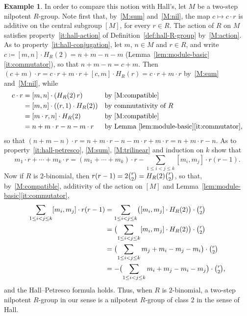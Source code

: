 \documentclass[reqno,a4paper]{amsart}
\renewcommand{\binom}{\tbinom} %
\theoremstyle{plain}
\theoremstyle{definition}
\newtheorem{example}[subsection]{Example}
\newcommand{\DefEq}{\coloneq}
\newcommand{\brk}[2]{\ensuremath{[#1,#2]}}
\begin{document}
\begin{example}
  In order to compare this notion with Hall's, let \(M\) be a two-step nilpotent \(R\)-group. Note first that, by~\ref{M:sum} and~\ref{M:nil}, the map \(c\mapsto c\cdot r\) is additive on the central subgroup \([M]\), for every \(r\in R\). The action of \(R\) on \(M\) satisfies property~\ref{it:hall-action} of Definition~\ref{def:hall-R-group} by~\ref{M:action}. As to property~\ref{it:hall-conjugation}, let \(m\), \(n\in M\) and \(r\in R\), and write \(c\DefEq\brk{m}{n}\cdot H_{R}(2)=n+m-n-m\) (Lemma~\ref{lem:module-basic}\ref{it:commutator}), so that \(n+m-n=c+m\). Then \((c+m)\cdot r=c\cdot r+m\cdot r+\brk{c}{m}\cdot H_{R}(r)=c\cdot r+m\cdot r\) by~\ref{M:sum} and~\ref{M:nil}, while
  \begin{align*}
    c\cdot r & =\brk{m}{n}\cdot(H_{R}(2)\,r)         &  & \text{by~\ref{M:compatible}}                               \\
             & =\brk{m}{n}\cdot((r,1)\cdot H_{R}(2)) &  & \text{by commutativity of \(R\)}                           \\
             & =\brk{m\cdot r}{n}\cdot H_{R}(2)      &  & \text{by~\ref{M:compatible}}                               \\
             & =n+m\cdot r-n-m\cdot r                &  & \text{by Lemma~\ref{lem:module-basic}\ref{it:commutator},}
  \end{align*}
  so that \((n+m-n)\cdot r=n+m\cdot r-n-m\cdot r+m\cdot r=n+m\cdot r-n\). As to property~\ref{it:hall-petresco}, \ref{M:sum}, \ref{M:trilinear} and induction on \(k\) show that
  \[
    m_{1}\cdot r+\cdots+m_{k}\cdot r=(m_{1}+\cdots+m_{k})\cdot r-\sum_{1\leq i<j\leq k}\brk{m_{i}}{m_{j}}\cdot r(r-1)\text{.}
  \]
  Now if \(R\) is \(2\)-binomial, then \(r(r-1)=2\binom{r}{2}=H_{R}(2)\binom{r}{2}\), so that, by~\ref{M:compatible}, additivity of the action on \([M]\) and Lemma~\ref{lem:module-basic}\ref{it:commutator},
  \begin{align*}
    \sum_{1\leq i<j\leq k}\brk{m_{i}}{m_{j}}\cdot r(r-1)
     & =\sum_{1\leq i<j\leq k}\bigl(\brk{m_{i}}{m_{j}}\cdot H_{R}(2)\bigr)\cdot\binom{r}{2} \\
     & =\bigl(\sum_{1\leq i<j\leq k}\brk{m_{i}}{m_{j}}\cdot H_{R}(2)\bigr)\cdot\binom{r}{2} \\
     & =\bigl(\sum_{1\leq i<j\leq k}m_{j}+m_{i}-m_{j}-m_{i}\bigr)\cdot\binom{r}{2}          \\
     & =-\bigl(\sum_{1\leq i<j\leq k}m_{i}+m_{j}-m_{i}-m_{j}\bigr)\cdot\binom{r}{2}\text{,}
  \end{align*}
  and the Hall--Petresco formula holds. Thus, when \(R\) is \(2\)-binomial, a two-step nilpotent \(R\)-group in our sense is a nilpotent \(R\)-group of class \(2\) in the sense of Hall.


\end{example}
\end{document}
